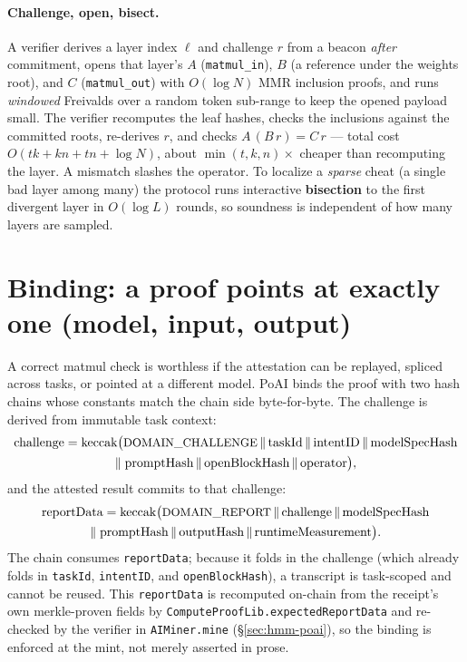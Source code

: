 \documentclass[11pt]{article}
\newcommand{\keccak}{\ensuremath{\mathrm{keccak}}}
\newcommand{\code}[1]{\texttt{#1}}
\begin{document}
\paragraph{Challenge, open, bisect.} A verifier derives a layer index
$\ell$ and challenge $r$ from a beacon \emph{after} commitment, opens that
layer's $A$ (\code{matmul\_in}), $B$ (a reference under the weights root), and
$C$ (\code{matmul\_out}) with $O(\log N)$ MMR inclusion proofs, and runs
\emph{windowed} Freivalds over a random token sub-range to keep the opened
payload small. The verifier recomputes the leaf hashes, checks the inclusions
against the committed roots, re-derives $r$, and checks $A\,(B\,r) = C\,r$ ---
total cost $O(t k + k n + t n + \log N)$, about $\min(t,k,n)\times$ cheaper than
recomputing the layer. A mismatch slashes the operator. To localize a
\emph{sparse} cheat (a single bad layer among many) the protocol runs interactive
\textbf{bisection} to the first divergent layer in $O(\log L)$ rounds, so
soundness is independent of how many layers are sampled.

\section{Binding: a proof points at exactly one (model, input, output)}
\label{sec:binding}

A correct matmul check is worthless if the attestation can be replayed, spliced
across tasks, or pointed at a different model. PoAI binds the proof with two
hash chains whose constants match the chain side byte-for-byte. The challenge is
derived from immutable task context:
\begin{multline*}
\text{challenge} = \keccak\big(\text{\small DOMAIN\_CHALLENGE} \,\|\,
  \text{taskId} \,\|\, \text{intentID} \,\|\, \text{modelSpecHash} \\
  \|\; \text{promptHash} \,\|\, \text{openBlockHash} \,\|\, \text{operator}\big),
\end{multline*}
and the attested result commits to that challenge:
\begin{multline*}
\text{reportData} = \keccak\big(\text{\small DOMAIN\_REPORT} \,\|\,
  \text{challenge} \,\|\, \text{modelSpecHash} \\
  \|\; \text{promptHash} \,\|\, \text{outputHash}
  \,\|\, \text{runtimeMeasurement}\big).
\end{multline*}
The chain consumes \code{reportData}; because it folds in the challenge (which
already folds in \code{taskId}, \code{intentID}, and \code{openBlockHash}), a
transcript is task-scoped and cannot be reused. This \code{reportData} is
recomputed on-chain from the receipt's own merkle-proven fields by
\code{ComputeProofLib.expectedReportData} and re-checked by the verifier in
\code{AIMiner.mine} (\S\ref{sec:hmm-poai}), so the binding is enforced at the
mint, not merely asserted in prose.
\end{document}
